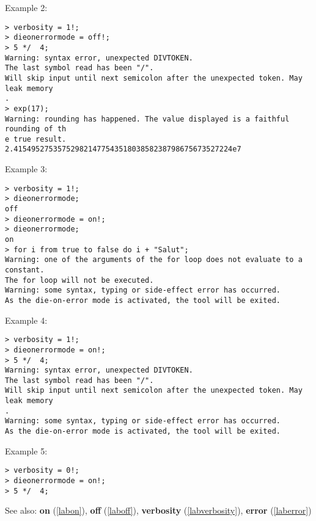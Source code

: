 \noindent Example 2: 
\begin{center}\begin{minipage}{15cm}\begin{Verbatim}[frame=single]
> verbosity = 1!;
> dieonerrormode = off!;
> 5 */  4;
Warning: syntax error, unexpected DIVTOKEN.
The last symbol read has been "/".
Will skip input until next semicolon after the unexpected token. May leak memory
.
> exp(17);
Warning: rounding has happened. The value displayed is a faithful rounding of th
e true result.
2.41549527535752982147754351803858238798675673527224e7
\end{Verbatim}
\end{minipage}\end{center}
\noindent Example 3: 
\begin{center}\begin{minipage}{15cm}\begin{Verbatim}[frame=single]
> verbosity = 1!;
> dieonerrormode;
off
> dieonerrormode = on!;
> dieonerrormode;
on
> for i from true to false do i + "Salut";
Warning: one of the arguments of the for loop does not evaluate to a constant.
The for loop will not be executed.
Warning: some syntax, typing or side-effect error has occurred.
As the die-on-error mode is activated, the tool will be exited.
\end{Verbatim}
\end{minipage}\end{center}
\noindent Example 4: 
\begin{center}\begin{minipage}{15cm}\begin{Verbatim}[frame=single]
> verbosity = 1!;
> dieonerrormode = on!;
> 5 */  4;
Warning: syntax error, unexpected DIVTOKEN.
The last symbol read has been "/".
Will skip input until next semicolon after the unexpected token. May leak memory
.
Warning: some syntax, typing or side-effect error has occurred.
As the die-on-error mode is activated, the tool will be exited.
\end{Verbatim}
\end{minipage}\end{center}
\noindent Example 5: 
\begin{center}\begin{minipage}{15cm}\begin{Verbatim}[frame=single]
> verbosity = 0!;
> dieonerrormode = on!;
> 5 */  4;
\end{Verbatim}
\end{minipage}\end{center}
See also: \textbf{on} (\ref{labon}), \textbf{off} (\ref{laboff}), \textbf{verbosity} (\ref{labverbosity}), \textbf{error} (\ref{laberror})
